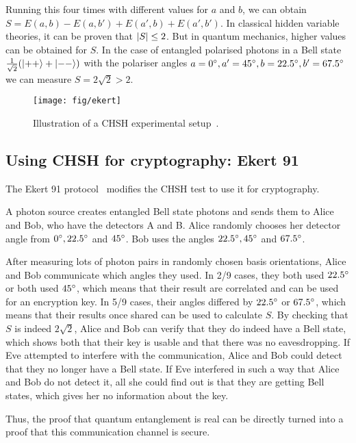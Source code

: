 \documentclass[12pt]{article}
\begin{document}
Running this four times with different values for $a$ and $b$, we can obtain $S = E(a, b) - E(a, b') + E(a', b) + E(a', b')$.
In classical hidden variable theories, it can be proven that $\abs{S} \leq 2$.
But in quantum mechanics, higher values can be obtained for $S$.
In the case of entangled polarised photons in a Bell state $\frac{1}{\sqrt{2}}\qty(\ket{++} + \ket{--})$ with the polariser angles $a = 0\degree, a' = 45\degree, b = 22.5\degree, b' = 67.5\degree$ we can measure $S = 2 \sqrt{2} > 2$.

\begin{figure}[h]
	\centering
	\texttt{[image: fig/ekert]}
	\caption{Illustration of a CHSH experimental setup~\citep{chsh}.}
	\label{fig:chsh}
\end{figure}

\subsection{Using CHSH for cryptography: Ekert 91}

The Ekert 91 protocol~\citep{ekert1991quantum} modifies the CHSH test to use it for cryptography.

A photon source creates entangled Bell state photons and sends them to Alice and Bob, who have the detectors A and B.
Alice randomly chooses her detector angle from $0\degree, 22.5\degree$ and $45\degree$.
Bob uses the angles $22.5\degree, 45\degree$ and $67.5\degree$.

After measuring lots of photon pairs in randomly chosen basis orientations, Alice and Bob communicate which angles they used.
In 2/9 cases, they both used $22.5\degree$ or both used $45\degree$, which means that their result are correlated and can be used for an encryption key.
In 5/9 cases, their angles differed by $22.5\degree$ or $67.5\degree$, which means that their results once shared can be used to calculate $S$.
By checking that $S$ is indeed $2\sqrt{2}$, Alice and Bob can verify that they do indeed have a Bell state, which shows both that their key is usable and that there was no eavesdropping.
If Eve attempted to interfere with the communication, Alice and Bob could detect that they no longer have a Bell state.
If Eve interfered in such a way that Alice and Bob do not detect it, all she could find out is that they are getting Bell states, which gives her no information about the key.

Thus, the proof that quantum entanglement is real can be directly turned into a proof that this communication channel is secure.
\end{document}
